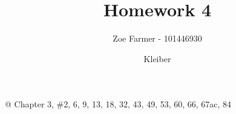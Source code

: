 \documentclass[10pt]{article}
\title{Homework 4}
\date{Kleiber}
\author{Zoe Farmer - 101446930}
\begin{document}
\maketitle

\begin{table}[!ht]
    \centering
\end{table}

\begin{easylist}[enumerate]
    @ Chapter 3, \#2, 6, 9, 13, 18, 32, 43, 49, 53, 60, 66, 67ac, 84


\end{easylist}
\end{document}
